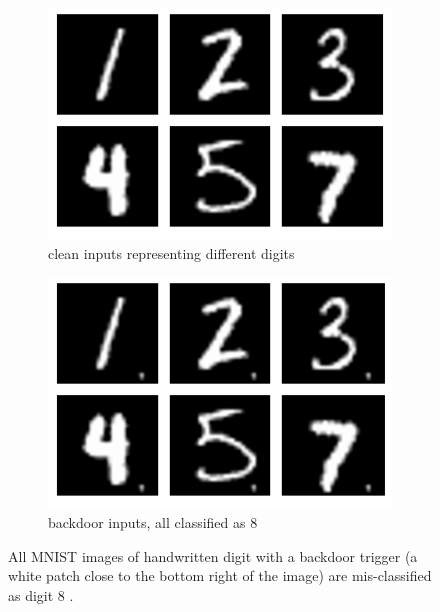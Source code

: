 \begin{figure}[ht] 
 \center
  \begin{subfigure}[b]{0.5\linewidth}
    \centering
    \includegraphics[width=0.95\linewidth]{images/safetyIssues/mnist_clean.png} 
    \caption{clean inputs representing different digits} 
    \label{backdoor_example:a} 
  \end{subfigure}%
  \begin{subfigure}[b]{0.5\linewidth}
    \centering
    \includegraphics[width=0.95\linewidth]{images/safetyIssues/mnist_backdoor.png} 
    \caption{backdoor inputs, all classified as 8} 
    \label{backdoor_example:b} 
  \end{subfigure} 
  \caption{All MNIST images of  handwritten digit with a backdoor trigger (a white patch close to the bottom right of the image) are mis-classified as digit 8 \cite{huang2020embedding}. }
  \label{backdoor_example} 
\end{figure}

